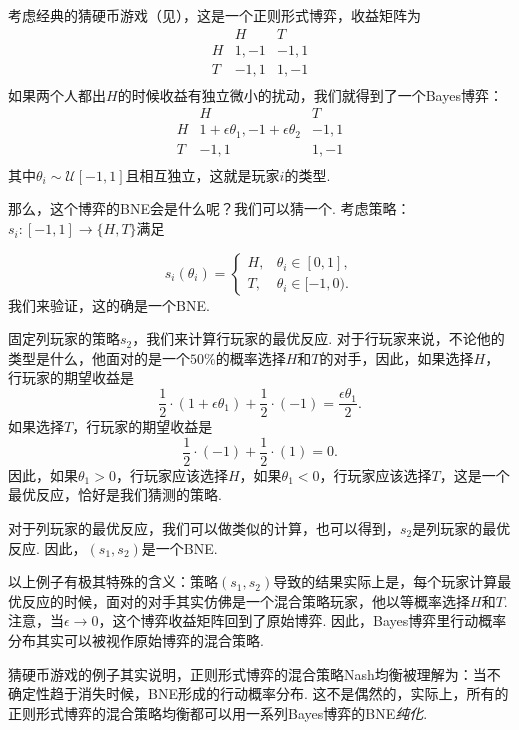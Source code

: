 \begin{example}[猜硬币游戏]
    考虑经典的猜硬币游戏（见），这是一个正则形式博弈，收益矩阵为
    \[
    \begin{array}{c|cc}
         &H&T  \\\hline
         H&1,-1 &-1,1\\
         T&-1,1&1,-1\\
    \end{array}
    \]
    如果两个人都出$H$的时候收益有独立微小的扰动，我们就得到了一个Bayes博弈：
    \[
    \begin{array}{c|cc}
         &H&T  \\\hline
         H&1+\epsilon\theta_1,-1+\epsilon\theta_2 &-1,1\\
         T&-1,1&1,-1\\
    \end{array}
    \]
    其中$\theta_i\sim\mathcal U[-1,1]$且相互独立，这就是玩家$i$的类型. 

    那么，这个博弈的BNE会是什么呢？我们可以猜一个. 考虑策略：$s_i:[-1,1]\to\{H,T\}$满足
    
    \[s_i(\theta_i)=\begin{cases}
    H,&\theta_i\in[0,1],\\
    T,&\theta_i\in[-1,0).
    \end{cases}\]
    我们来验证，这的确是一个BNE.

    固定列玩家的策略$s_2$，我们来计算行玩家的最优反应. 对于行玩家来说，不论他的类型是什么，他面对的是一个$50\%$的概率选择$H$和$T$的对手，因此，如果选择$H$，行玩家的期望收益是
    \[\frac{1}{2}\cdot (1+\epsilon\theta_1)+\frac{1}{2}\cdot(-1)=\frac{\epsilon\theta_1}{2}. \]
    如果选择$T$，行玩家的期望收益是
    \[\frac{1}{2}\cdot(-1)+\frac{1}{2}\cdot(1)=0. \]
    因此，如果$\theta_1>0$，行玩家应该选择$H$，如果$\theta_1<0$，行玩家应该选择$T$，这是一个最优反应，恰好是我们猜测的策略.

    对于列玩家的最优反应，我们可以做类似的计算，也可以得到，$s_2$是列玩家的最优反应. 因此，$(s_1,s_2)$是一个BNE.
\end{example}

以上例子有极其特殊的含义：策略$(s_1,s_2)$导致的结果实际上是，每个玩家计算最优反应的时候，面对的对手其实仿佛是一个混合策略玩家，他以等概率选择$H$和$T$. 注意，当$\epsilon\to 0$，这个博弈收益矩阵回到了原始博弈. 因此，Bayes博弈里行动概率分布其实可以被视作原始博弈的混合策略.

猜硬币游戏的例子其实说明，正则形式博弈的混合策略Nash均衡被理解为：当不确定性趋于消失时候，BNE形成的行动概率分布. 这不是偶然的，实际上，所有的正则形式博弈的混合策略均衡都可以用一系列Bayes博弈的BNE\emph{纯化}.

